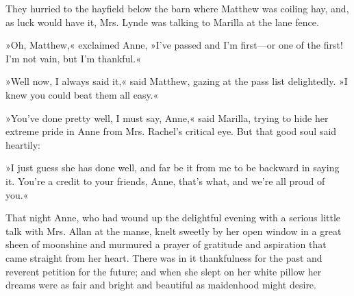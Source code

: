 They hurried to the hayfield below the barn where Matthew was coiling hay, and, as luck would have it, Mrs. Lynde was talking to Marilla at the lane fence.

»Oh, Matthew,« exclaimed Anne, »I’ve passed and I’m first—or one of the first! I’m not vain, but I’m thankful.«

»Well now, I always said it,« said Matthew, gazing at the pass list delightedly. »I knew you could beat them all easy.«

»You’ve done pretty well, I must say, Anne,« said Marilla, trying to hide her extreme pride in Anne from Mrs. Rachel’s critical eye. But that good soul said heartily:

»I just guess she has done well, and far be it from me to be backward in saying it. You’re a credit to your friends, Anne, that’s what, and we’re all proud of you.«

That night Anne, who had wound up the delightful evening with a serious little talk with Mrs. Allan at the manse, knelt sweetly by her open window in a great sheen of moonshine and murmured a prayer of gratitude and aspiration that came straight from her heart. There was in it thankfulness for the past and reverent petition for the future; and when she slept on her white pillow her dreams were as fair and bright and beautiful as maidenhood might desire.